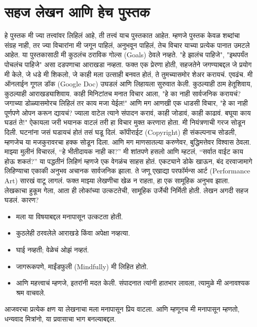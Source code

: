  \chapter{सहज लेखन आणि हेच पुस्तक}
हे पुस्तक मी ज्या तत्त्वांवर लिहिलं आहे, ती तत्त्वं याच पुस्तकात आहेत. म्हणजे पुस्तक केवळ शब्दांचा संग्रह नाही, तर ज्या विचारांना मी जगून पाहिलं, अनुभवून पाहिलं, तेच विचार याच्या प्रत्येक पानात उमटले आहेत.
या पुस्तकासाठी मी कुठलंच ठराविक गोल्स (Goals) ठेवले नव्हते. "हे झालंच पाहिजे", "इथपर्यंत पोचलंच पाहिजे" असा दडपणाचा आराखडा नव्हता. फक्त एक प्रेरणा होती,  सहजतेने जगण्याबद्दल जे प्रयोग मी केले, जे धडे मी शिकलो, जे काही मला उत्साही बनवत होतं, ते तुमच्यासमोर शेअर करायचं. एवढंच.
मी ऑनलाईन गूगल डॉक (Google Doc) उघडलं आणि लिहायला सुरुवात केली. कुठल्याही ठाम हेतूशिवाय, कुठल्याही आराखड्याशिवाय. काही मिनिटांतच मनात विचार आला,  "हे का नाही सार्वजनिक करायचं? जगाच्या डोळ्यासमोरच लिहिलं तर काय मजा येईल!" आणि मग आणखी एक धाडसी विचार,  "हे का नाही पूर्णपणे ओपन करून द्यायचं? ज्याला वाटेल त्याने संपादन करावं, काही जोडावं, काही काढावं. बघूया काय घडतं ते!"
ऐकायला जरी भयानक वाटलं तरी हा विचार मुक्त करणारा होता. मी नियंत्रणाची गरज सोडून दिली. घटनांना जसं घडायचं होतं तसं घडू दिलं. कॉपीराईट (Copyright) ही संकल्पनाच सोडली, म्हणजेच या मजकुरावरचा हक्क सोडून दिला. आणि मग माणसातल्या करुणेवर, बुद्धिमत्तेवर विश्वास ठेवला.
माझ्या मुलीनं विचारलं, “हे भीतीदायक नाही का?”
 मी शांतपणे हसलो आणि म्हटलं, “सर्वात वाईट काय होऊ शकतं?”
या पद्धतीनं लिहिणं म्हणजे एक वेगळंच साहस होतं. एकट्याने डोके खाऊन, बंद दरवाजामागे लिहिण्याचा एकाकी अनुभव अचानक सार्वजनिक झाला. ते जणू एखाद्या परफॉर्मन्स आर्ट (Performance Art) सारखं वाटू लागलं. फक्त माझ्या लेखणीचा खेळ न राहता, हा एक सामूहिक अनुभव झाला. लेखकाचा हुकूम गेला, आता ही लोकांच्या उत्कटतेची, सामूहिक उर्जेची निर्मिती होती.
लेखन अगदी सहज घडलं. कारण?
 \begin{itemize}
 \item मला या विषयाबद्दल मनापासून उत्कटता होती.
 \item कुठलेही ठरवलेले आराखडे किंवा अपेक्षा नव्हत्या.
 \item घाई नव्हती; वेळेचं ओझं नव्हतं.
 \item जागरूकपणे, माईंडफुली (Mindfully) मी लिहित होतो.
 \item आणि महत्त्वाचं म्हणजे, इतरांनी मदत केली. संपादनात त्यांनी हातभार लावला, त्यामुळे मी अनावश्यक श्रम वाचवले.
 \end{itemize}
आजवरचा प्रत्येक क्षण या लेखनाचा मला मनापासून प्रिय वाटला. आणि म्हणूनच मी मनापासून म्हणतो,  धन्यवाद मित्रांनो, या प्रवासाचा भाग बनल्याबद्दल.


